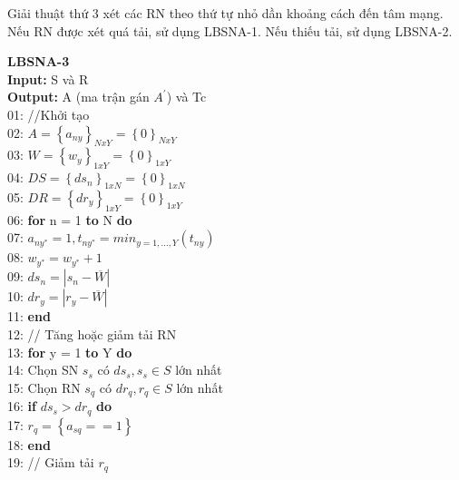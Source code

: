 \documentclass[hidelinks, 11pt, a4paper]{report}
\newenvironment{codeb}{\code}{\par}
\begin{document}
Giải thuật thứ 3 xét các RN theo thứ tự nhỏ dần khoảng cách đến tâm mạng. Nếu RN được xét quá tải, sử dụng LBSNA-1. Nếu thiếu tải, sử dụng LBSNA-2.

\textbf{LBSNA-3}\\
\begin{codeb}
    \textbf{Input:} S và R\\
    \textbf{Output:} A (ma trận gán $A^{'}$) và Tc\\
    01: //Khởi tạo\\
    02: $A = \left\{a_{ny}\right\}_{NxY} = \left\{0\right\}_{NxY}$\\
    03: $W = \left\{w_{y}\right\}_{1xY} = \left\{0\right\}_{1xY}$\\
    04: $DS = \left\{ds_{n}\right\}_{1xN} = \left\{0\right\}_{1xN}$\\
    05: $DR = \left\{dr_{y}\right\}_{1xY} = \left\{0\right\}_{1xY}$\\
    06: \textbf{for} n = 1 \textbf{to} N \textbf{do}\\
    07: \hspace{2mm}$a_{ny^*} = 1, t_{ny^*} = min_{y=1,...,Y}(t_{ny})$\\
    08: \hspace{2mm}$w_{y^*} = w_{y^*} + 1$\\
    09: \hspace{2mm}$ds_n = |s_n - \overline{W}|$\\
    10: \hspace{2mm}$dr_y = |r_y - \overline{W}|$\\
    11: \textbf{end}\\
    12: // Tăng hoặc giảm tải RN\\
    13: \textbf{for} y = 1 \textbf{to} Y \textbf{do}\\
    14: \hspace{2mm}Chọn SN $s_s$ có $ds_s, s_s \in S$ lớn nhất\\
    15: \hspace{2mm}Chọn RN $s_q$ có $dr_q, r_q \in S$ lớn nhất\\
    16: \hspace{2mm}\textbf{if} $ds_s > dr_q$ \textbf{do}\\
    17: \hspace{4mm}$r_q = \left\{a_{sq} == 1\right\}$\\
    18: \hspace{2mm}\textbf{end}\\
    19: \hspace{2mm}// Giảm tải $r_q$\\

\end{codeb}
\end{document}
